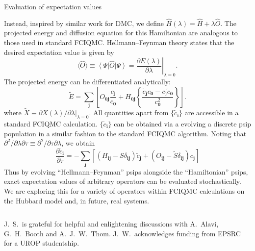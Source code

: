 \documentclass[final]{beamer} %
\newcommand{\ket}[1]{\left\vert#1\right\rangle}
\newcommand{\bra}[1]{\left\langle#1\right\vert}
\newcommand{\pdd}[2]{\frac{\partial#1}{\partial#2}}
\newcommand{\mean}[1]{\langle#1\rangle}
\newcommand{\Hamil}{\hat{H}}
\newcommand{\Op}{\hat{O}}
\newcommand{\bz}{\mathbf{0}}
\newcommand{\bi}{\mathbf{i}}
\newcommand{\bj}{\mathbf{j}}
\begin{document}
\begin{frame}[t]
\begin{columns}[t]
\begin{column}{0.9\paperwidth}
\begin{columns}[t]
\begin{column}{0.55\paperwidth}
\begin{block}{Evaluation of expectation values}
\begin{multicols}{2}
           Instead, inspired by similar work for DMC\cite{gaudoin:2007}, we define $\Hamil(\lambda) = \Hamil + \lambda\Op$.  The projected energy and diffusion equation for this Hamiltonian are analogous to those used in standard FCIQMC.  Hellmann--Feynman theory states that the desired expectation value is given by
           \begin{equation}
               \mean{\Op} \equiv \bra{\Psi}\Op\ket{\Psi} = \left.\pdd{E(\lambda)}{\lambda}\right|_{\lambda=0}.
           \end{equation}
           The projected energy can be differentiated analytically:
           \begin{equation}
               \tilde{E} = \sum_\bj \left[ O_{\bz\bj} \frac{c_\bj}{c_\bz} + H_{\bz\bj} \left\{ \frac{\tilde{c}_\bj c_\bz - c_\bj \tilde{c}_\bz}{c_\bz^2} \right\} \right].
           \end{equation}
           where $\tilde{X}\equiv\left.\partial X(\lambda)/\partial\lambda\right|_{\lambda=0}$.  All quantities apart from $\{\tilde{c}_\bi\}$ are accessible in a standard FCIQMC calculation.  $\{\tilde{c}_\bi\}$ can be obtained via a evolving a discrete psip population in a similar fashion to the standard FCIQMC algorithm.  Noting that $\partial^2/\partial\lambda\partial\tau\equiv\partial^2/\partial\tau\partial\lambda$, we obtain
           \begin{equation}
           \pdd{\tilde{c}_\bi}{\tau} = - \sum_\bj \left[\left(H_{\bi\bj} -S\delta_{\bi\bj}\right)\tilde{c}_\bj + \left(O_{\bi\bj} - \tilde{S}\delta_{\bi\bj}\right)c_\bj\right]
           \end{equation}
           Thus by evolving ``Hellmann--Feynman'' psips alongside the ``Hamiltonian'' psips, exact expectation values of arbitrary operators can be evaluated stochastically.  We are exploring this for a variety of operators within FCIQMC calculations on the Hubbard model and, in future, real systems.
           \end{multicols}
           \end{block}
       \end{column}
%
   \end{columns}
%
%
       \footnotesize{
           \begin{block}{}
               \begin{multicols}{3}
               J.~S.~is grateful for helpful and enlightening discussions with
               A.~Alavi, G.~H.~Booth and A.~J.~W.~Thom.  J.~W.~acknowledges funding
               from EPSRC for a UROP studentship.
               
               
               \end{multicols}
           \end{block}
       }
%
\end{column}
\end{columns}
\end{frame}
%
\end{document}
